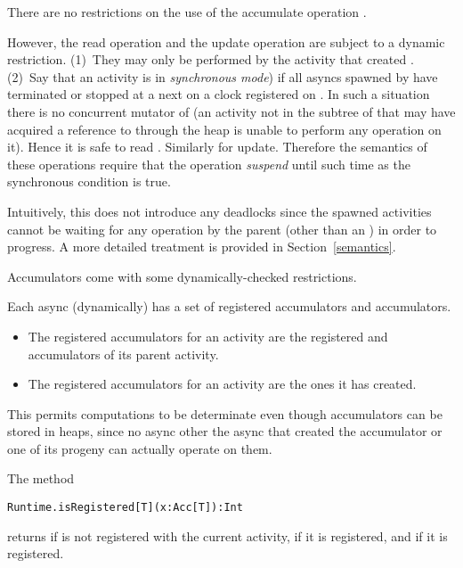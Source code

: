 There are no restrictions on the use of the accumulate operation
. 

However, the read operation  and the update operation
 are subject to a dynamic restriction. (1)~They may only
be performed by the activity that created . (2)~Say that an
activity  is in {\em synchronous mode}) if all asyncs spawned
by  have terminated or stopped at a next on a clock registered
on .  In such a situation there is no concurrent mutator of
 (an activity not in the subtree of  that may have
acquired a reference to  through the heap is unable to perform
any operation on it). Hence it is safe to read . Similarly for
update. Therefore the semantics of these operations require that the
operation {\em suspend} until such time as the synchronous condition
is true. 

Intuitively, this does not introduce any deadlocks since the
spawned activities cannot be waiting for any operation by the parent
(other than an ) in order to progress. A more detailed
treatment is provided in Section~\ref{semantics}.



Accumulators come with some dynamically-checked restrictions.

Each async (dynamically) has a set of registered  accumulators
  and  accumulators.
  \begin{itemize}
  \item The registered  accumulators for an activity are
    the registered  and  accumulators of its
    parent activity.

  \item The registered  accumulators for an activity are
    the ones it has created.
  \end{itemize}

This permits computations to be determinate even though accumulators
can be stored in heaps, since no async other the async that created
the accumulator or one of its progeny can actually operate on them.


The method
\begin{lstlisting}
Runtime.isRegistered[T](x:Acc[T]):Int
\end{lstlisting}

\noindent returns  if  is not registered with the
current activity,  if it is  registered, and  if
it is  registered.

